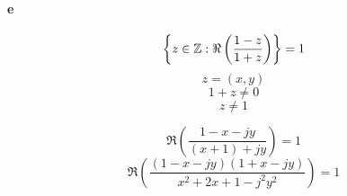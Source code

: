 \documentclass[a4paper]{article}
\begin{document}
	\paragraph{e}
	\[ \left\{ z \in \mathbb{Z} : \Re\left( \frac{ 1-z }{ 1+z } \right) \right\} = 1 \]
	\[ z = (x,y) \]
	\[ 1 + z \neq 0 \]
	\[ z \neq 1 \]

	\[ \Re\left( \frac{ 1 - x - jy }{ (x+1) + jy } \right) = 1 \]
	\[ \Re\left( \frac{ (1 - x - jy)(1 + x -jy) }{ x^2 + 2x + 1 - j^2y^2 } \right) = 1 \]

\end{document}
